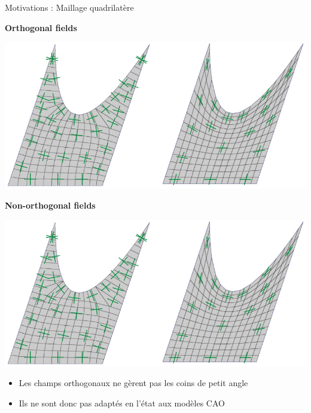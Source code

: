 \begin{frame}{Motivations : Maillage quadrilatère}
    \centering
    
    \begin{minipage}[c]{0.48\textwidth}
    \centering 
    \textbf{Orthogonal fields}\\
    \vspace{0.3cm}
    \begin{adjustbox}{width=0.8\linewidth,clip,trim=0 0 {.48\width} 0}
        \includegraphics{img_spm_ff/comp1.png}
    \end{adjustbox}
    \end{minipage}%
    \hfill\vline\hfill
    \begin{minipage}[c]{0.48\textwidth}
    \centering 
    \textbf{Non-orthogonal fields}\\
    \vspace{0.3cm}
    \begin{adjustbox}{width=0.75\linewidth,clip,trim={.52\width} 0 0 0}
        \includegraphics{img_spm_ff/comp1.png}
    \end{adjustbox}
    \end{minipage}
    
    \vspace*{0.3cm}
    \begin{itemize}
         \item Les champs orthogonaux ne gèrent pas les coins de petit angle
         \item Ils ne sont donc pas adaptés en l'état aux modèles CAO
    \end{itemize}
    
\end{frame}

